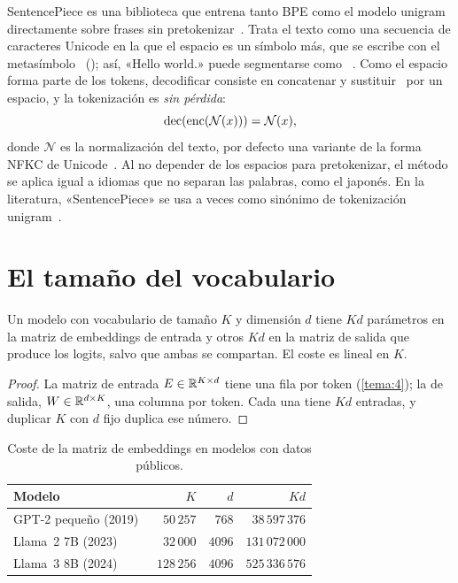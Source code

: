 SentencePiece es una biblioteca que entrena tanto BPE como el modelo unigram directamente sobre frases sin pretokenizar~\cite{sentencepiece}. Trata el texto como una secuencia de caracteres Unicode en la que el espacio es un símbolo más, que se escribe con el metasímbolo \ESP\ (); así, «Hello world.» puede segmentarse como ~\cite[§3.1]{sentencepiece}. Como el espacio forma parte de los tokens, decodificar consiste en concatenar y sustituir \ESP\ por un espacio, y la tokenización es \emph{sin pérdida}:
\[
\operatorname{dec}(\operatorname{enc}(\mathcal{N}(x)))=\mathcal{N}(x),
\]
donde $\mathcal{N}$ es la normalización del texto, por defecto una variante de la forma NFKC de Unicode~\cite[§3.4]{sentencepiece}. Al no depender de los espacios para pretokenizar, el método se aplica igual a idiomas que no separan las palabras, como el japonés. En la literatura, «SentencePiece» se usa a veces como sinónimo de tokenización unigram~\cite[§2.4.3]{jm3}.

\section{El tamaño del vocabulario}

\begin{proposicion}\label{prop:coste-vocab}
Un modelo con vocabulario de tamaño $K$ y dimensión $d$ tiene $Kd$ parámetros en la matriz de embeddings de entrada y otros $Kd$ en la matriz de salida que produce los logits, salvo que ambas se compartan. El coste es lineal en $K$.
\end{proposicion}

\begin{proof}
La matriz de entrada $E\in\mathbb{R}^{K\times d}$ tiene una fila por token (\cref{tema:4}); la de salida, $W\in\mathbb{R}^{d\times K}$, una columna por token. Cada una tiene $Kd$ entradas, y duplicar $K$ con $d$ fijo duplica ese número.
\end{proof}

\begin{table}[h]
\centering\small
\caption{Coste de la matriz de embeddings en modelos con datos públicos.}\label{tab:vocab-modelos}
\begin{tabular}{@{}lrrr@{}}
\toprule
Modelo & $K$ & $d$ & $Kd$ \\
\midrule
GPT-2 pequeño (2019)~\cite{gpt2} & $50\,257$ & $768$ & $38\,597\,376$ \\
Llama~2 7B (2023)~\cite{llama2} & $32\,000$ & $4096$ & $131\,072\,000$ \\
Llama~3 8B (2024)~\cite{llama3} & $128\,256$ & $4096$ & $525\,336\,576$ \\
\bottomrule
\end{tabular}
\end{table}

